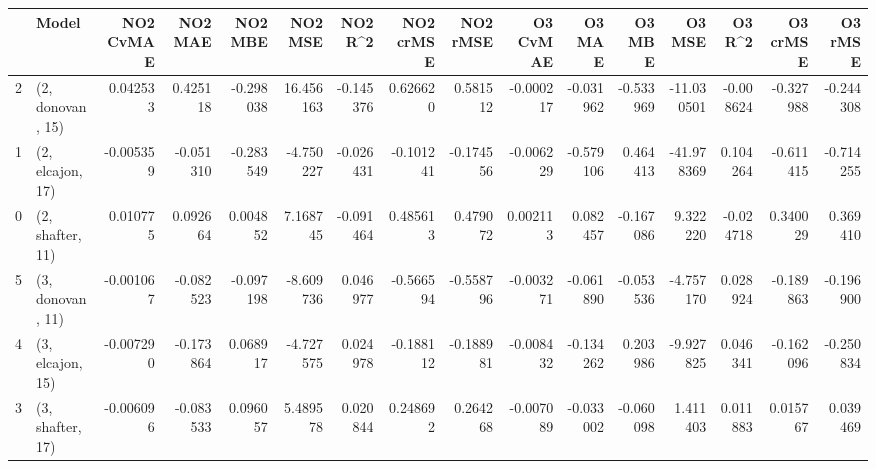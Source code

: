 \begin{tabular}{llrrrrrrrrrrrrrr}
\toprule
{} &             Model &  NO2 CvMAE &   NO2 MAE &   NO2 MBE &    NO2 MSE &   NO2 R\textasciicircum2 &  NO2 crMSE &  NO2 rMSE &  O3 CvMAE &    O3 MAE &    O3 MBE &     O3 MSE &    O3 R\textasciicircum2 &  O3 crMSE &   O3 rMSE \\
\midrule
2 &  (2, donovan, 15) &   0.042533 &  0.425118 & -0.298038 &  16.456163 & -0.145376 &   0.626620 &  0.581512 & -0.000217 & -0.031962 & -0.533969 & -11.030501 & -0.008624 & -0.327988 & -0.244308 \\
1 &  (2, elcajon, 17) &  -0.005359 & -0.051310 & -0.283549 &  -4.750227 & -0.026431 &  -0.101241 & -0.174556 & -0.006229 & -0.579106 &  0.464413 & -41.978369 &  0.104264 & -0.611415 & -0.714255 \\
0 &  (2, shafter, 11) &   0.010775 &  0.092664 &  0.004852 &   7.168745 & -0.091464 &   0.485613 &  0.479072 &  0.002113 &  0.082457 & -0.167086 &   9.322220 & -0.024718 &  0.340029 &  0.369410 \\
5 &  (3, donovan, 11) &  -0.001067 & -0.082523 & -0.097198 &  -8.609736 &  0.046977 &  -0.566594 & -0.558796 & -0.003271 & -0.061890 & -0.053536 &  -4.757170 &  0.028924 & -0.189863 & -0.196900 \\
4 &  (3, elcajon, 15) &  -0.007290 & -0.173864 &  0.068917 &  -4.727575 &  0.024978 &  -0.188112 & -0.188981 & -0.008432 & -0.134262 &  0.203986 &  -9.927825 &  0.046341 & -0.162096 & -0.250834 \\
3 &  (3, shafter, 17) &  -0.006096 & -0.083533 &  0.096057 &   5.489578 &  0.020844 &   0.248692 &  0.264268 & -0.007089 & -0.033002 & -0.060098 &   1.411403 &  0.011883 &  0.015767 &  0.039469 \\
\bottomrule
\end{tabular}
